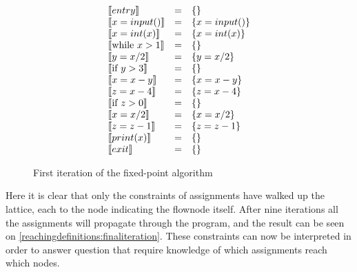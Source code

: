 \begin{figure}[H]
\[
\begin{array}{lcl}
  \llbracket entry \rrbracket & = & \{\}\\
  \llbracket x = input() \rrbracket & = & \{x = input()\}\\
  \llbracket x = int(x) \rrbracket & = & \{x = int(x)\}\\
  \llbracket \text{while } x > 1 \rrbracket & = & \{\}\\
  \llbracket  y = x / 2 \rrbracket & = & \{ y = x / 2\}\\
  \llbracket \text{if } y > 3 \rrbracket & = & \{\}\\
  \llbracket  x = x-y \rrbracket & = & \{ x = x - y \} \\
  \llbracket  z = x-4 \rrbracket & = & \{z = x-4 \} \\
  \llbracket \text{if } z > 0 \rrbracket & = & \{\}\\
  \llbracket x = x / 2 \rrbracket & = & \{ x = x / 2 \}\\
  \llbracket z = z - 1 \rrbracket & = & \{ z = z -1 \} \\
  \llbracket print(x) \rrbracket & = & \{\}\\
  \llbracket exit \rrbracket & = & \{\}\\
\end{array}
\]
\caption{First iteration of the fixed-point algorithm}
\label{reachingdefinitions:firstiteration}
\end{figure}

Here it is clear that only the constraints of assignments have walked up the lattice, each to the node indicating the flownode itself.
After nine iterations all the assignments will propagate through the program, and the result can be seen on \cref{reachingdefinitions:finaliteration}.
These constraints can now be interpreted in order to answer question that require knowledge of which assignments reach which nodes.

